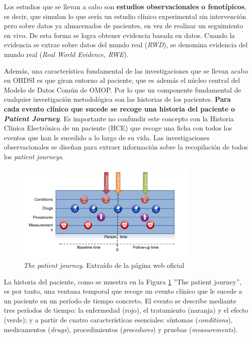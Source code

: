 Los estudios que se llevan a cabo son \textbf{estudios observacionales o fenotípicos}, es decir, que simulan lo que sería un estudio clínico experimental sin intervención pero sobre datos ya almacenados de pacientes, en vez de realizar un seguimiento en vivo. De esta forma se logra obtener evidencia basada en datos. Cuando la evidencia se extrae sobre datos del mundo real (\textit{RWD}), se denomina evidencia del mundo real (\textit{Real World Evidence, RWE}).


Además, una característica fundamental de las investigaciones que se llevan acabo en OHDSI es que giran entorno al paciente, que es además el núcleo central del Modelo de Datos Común de OMOP. Por lo que un componente fundamental de cualquier investigación metodológica son las historias de los pacientes. \textbf{Para cada evento clínico que sucede se recoge una historia del paciente o \textit{Patient Journey}}. Es importante no confundir este concepto con la Historia Clínica Electrónica de un paciente (HCE) que recoge una ficha con todos los eventos que han le sucedido a lo largo de su vida. Las investigaciones observacionales se diseñan para extraer información sobre la recopilación de todos los \textit{patient journeys}.

\begin{figure}[H]
    \centering
    \includegraphics[width=0.80\textwidth]{figures/patientJourney.png}
     \caption{\textit{The patient journey}. Extraído de la página web oficial \cite{OHDSIbook}}
    \label{fig:patientJourney}
\end{figure}

La historia del paciente,  como se muestra en la Figura \ref{fig:patientJourney} ''The patient journey'', es por tanto, una ventana temporal que recoge un evento clínico que le sucede a un paciente en un período de tiempo concreto. El evento se describe mediante tres períodos de tiempo: la enfermedad (rojo), el tratamiento (naranja) y el efecto (verde); y a partir de cuatro características esenciales: síntomas (\textit{conditions}), medicamentos (\textit{drugs}), procedimientos (\textit{procedures}) y pruebas (\textit{measurements}).

